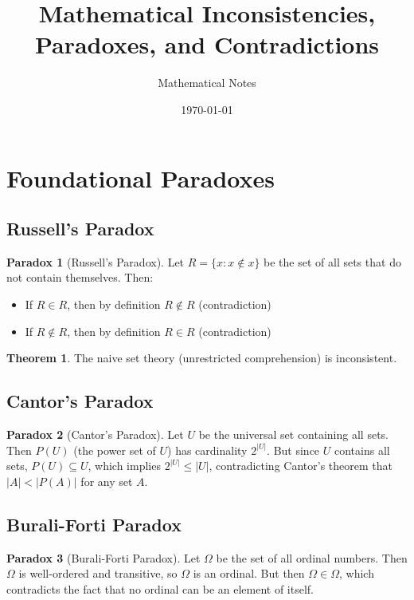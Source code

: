 \documentclass[11pt]{article}
\title{Mathematical Inconsistencies, Paradoxes, and Contradictions}
\author{Mathematical Notes}
\date{\today}
\theoremstyle{definition}
\newtheorem{theorem}{Theorem}[section]
\newtheorem{paradox}{Paradox}[section]
\begin{document}
\maketitle

\tableofcontents
\newpage

\section{Foundational Paradoxes}

\subsection{Russell's Paradox}
\begin{paradox}[Russell's Paradox]
Let $R = \{x : x \notin x\}$ be the set of all sets that do not contain themselves. Then:
\begin{itemize}
    \item If $R \in R$, then by definition $R \notin R$ (contradiction)
    \item If $R \notin R$, then by definition $R \in R$ (contradiction)
\end{itemize}
\end{paradox}

\begin{theorem}
The naive set theory (unrestricted comprehension) is inconsistent.
\end{theorem}

\subsection{Cantor's Paradox}
\begin{paradox}[Cantor's Paradox]
Let $U$ be the universal set containing all sets. Then $P(U)$ (the power set of $U$) has cardinality $2^{|U|}$. But since $U$ contains all sets, $P(U) \subseteq U$, which implies $2^{|U|} \leq |U|$, contradicting Cantor's theorem that $|A| < |P(A)|$ for any set $A$.
\end{paradox}

\subsection{Burali-Forti Paradox}
\begin{paradox}[Burali-Forti Paradox]
Let $\Omega$ be the set of all ordinal numbers. Then $\Omega$ is well-ordered and transitive, so $\Omega$ is an ordinal. But then $\Omega \in \Omega$, which contradicts the fact that no ordinal can be an element of itself.
\end{paradox}
\end{document}
